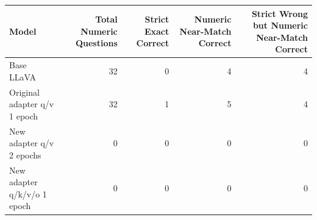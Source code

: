 \begin{tabular}{lrrrr}
\toprule
Model & Total Numeric Questions & Strict Exact Correct & Numeric Near-Match Correct & Strict Wrong but Numeric Near-Match Correct \\
\midrule
Base LLaVA & 32 & 0 & 4 & 4 \\
Original adapter q/v 1 epoch & 32 & 1 & 5 & 4 \\
New adapter q/v 2 epochs & 0 & 0 & 0 & 0 \\
New adapter q/k/v/o 1 epoch & 0 & 0 & 0 & 0 \\
\bottomrule
\end{tabular}
